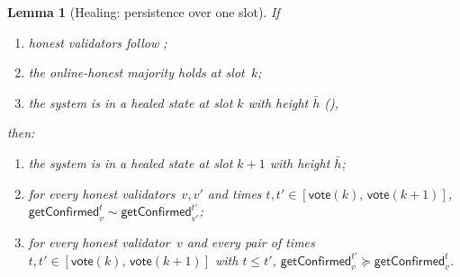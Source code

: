 \ifx\litemode\undefined\documentclass{article}\fi
\newcommand{\vote}{\mathsf{vote}}
\newcommand{\comm}[1]{\bar{#1}}
\newcommand{\getConfirmed}{\textsf{getConfirmed}\xspace}
\theoremstyle{plain}
\newtheorem{lemma}{Lemma}
\theoremstyle{definition}
\theoremstyle{remark}
\newcommand{\OHM}{online-honest majority\xspace}
\begin{document}
\begin{lemma}[Healing: persistence over one slot]\label{rev:lem:healing-persistence}
If
\begin{enumerate}
  \item\label{rev:hp:f} honest validators follow ;
  \item\label{rev:hp:ohm} the \OHM holds at slot~$k$;
  \item\label{rev:hp:hs} the system is in a healed state at slot $k$ with height $\comm{h}$ (),
\end{enumerate}
then:
\begin{enumerate}
  \item the system is in a healed state at slot $k+1$ with height $\comm{h}$;
  \item for every honest validators~$v,v'$ and times $t, t' \in [\vote(k),\, \vote(k+1)]$, $\getConfirmed_v^{t} \sim \getConfirmed_{v'}^{t'}$;
  \item for every honest validator~$v$ and every pair of times $t, t' \in [\vote(k),\, \vote(k+1)]$ with $t \leq t'$, $\getConfirmed_v^{t'} \succeq \getConfirmed_v^t$.
\end{enumerate}
\end{lemma}
\end{document}
